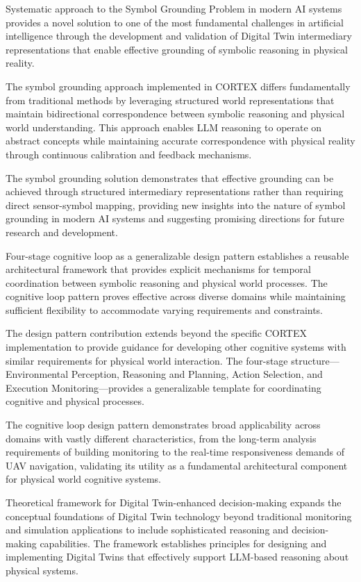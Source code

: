 Systematic approach to the Symbol Grounding Problem in modern AI systems provides a novel solution to one of the most fundamental challenges in artificial intelligence through the development and validation of Digital Twin intermediary representations that enable effective grounding of symbolic reasoning in physical reality.

The symbol grounding approach implemented in CORTEX differs fundamentally from traditional methods by leveraging structured world representations that maintain bidirectional correspondence between symbolic reasoning and physical world understanding. This approach enables LLM reasoning to operate on abstract concepts while maintaining accurate correspondence with physical reality through continuous calibration and feedback mechanisms.

The symbol grounding solution demonstrates that effective grounding can be achieved through structured intermediary representations rather than requiring direct sensor-symbol mapping, providing new insights into the nature of symbol grounding in modern AI systems and suggesting promising directions for future research and development.

Four-stage cognitive loop as a generalizable design pattern establishes a reusable architectural framework that provides explicit mechanisms for temporal coordination between symbolic reasoning and physical world processes. The cognitive loop pattern proves effective across diverse domains while maintaining sufficient flexibility to accommodate varying requirements and constraints.

The design pattern contribution extends beyond the specific CORTEX implementation to provide guidance for developing other cognitive systems with similar requirements for physical world interaction. The four-stage structure—Environmental Perception, Reasoning and Planning, Action Selection, and Execution Monitoring—provides a generalizable template for coordinating cognitive and physical processes.

The cognitive loop design pattern demonstrates broad applicability across domains with vastly different characteristics, from the long-term analysis requirements of building monitoring to the real-time responsiveness demands of UAV navigation, validating its utility as a fundamental architectural component for physical world cognitive systems.

Theoretical framework for Digital Twin-enhanced decision-making expands the conceptual foundations of Digital Twin technology beyond traditional monitoring and simulation applications to include sophisticated reasoning and decision-making capabilities. The framework establishes principles for designing and implementing Digital Twins that effectively support LLM-based reasoning about physical systems.

